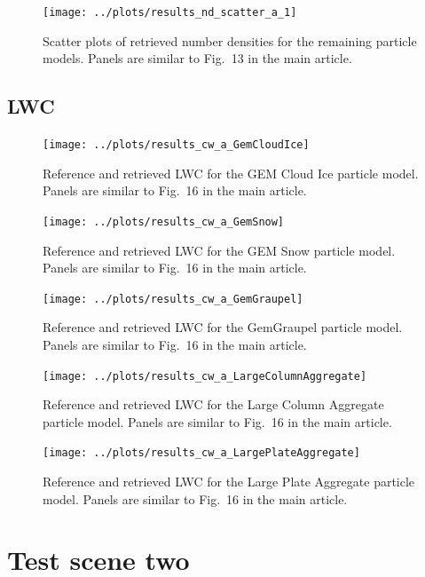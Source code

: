 \documentclass[journal abbreviation, manuscript]{copernicus}
\begin{document}
\begin{figure}[!hbpt]
\centering
\texttt{[image: ../plots/results\_nd\_scatter\_a\_1]}
\caption{Scatter plots of retrieved number densities for the remaining particle models. Panels
are similar to Fig.~13 in the main article.}
\end{figure}

\subsection{LWC}

\begin{figure}[!hbpt]
\centering
\texttt{[image: ../plots/results\_cw\_a\_GemCloudIce]}
\caption{Reference and retrieved LWC for the GEM Cloud Ice particle model. Panels
are similar to Fig.~16 in the main article.}
\end{figure}
\clearpage

\begin{figure}[!hbpt]
\centering
\texttt{[image: ../plots/results\_cw\_a\_GemSnow]}
\caption{Reference and retrieved LWC for the GEM Snow particle model. Panels
are similar to Fig.~16 in the main article.}
\end{figure}
\clearpage

\begin{figure}[!hbpt]
\centering
\texttt{[image: ../plots/results\_cw\_a\_GemGraupel]}
\caption{Reference and retrieved LWC for the GemGraupel particle model. Panels
are similar to Fig.~16 in the main article.}
\end{figure}
\clearpage

\begin{figure}[!hbpt]
\centering
\texttt{[image: ../plots/results\_cw\_a\_LargeColumnAggregate]}
\caption{Reference and retrieved LWC for the Large Column Aggregate particle model. Panels
are similar to Fig.~16 in the main article.}
\end{figure}
\clearpage

\begin{figure}[!hbpt]
\centering
\texttt{[image: ../plots/results\_cw\_a\_LargePlateAggregate]}
\caption{Reference and retrieved LWC for the Large Plate Aggregate particle model. Panels
are similar to Fig.~16 in the main article.}
\end{figure}
\clearpage

\section{Test scene two}
\end{document}
